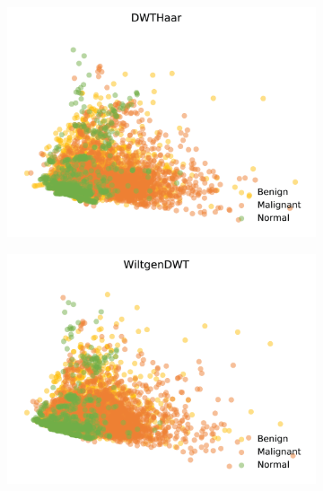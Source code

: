 \begin{figure}[H]
    \begin{subfigure}{.3\textwidth}
      \includegraphics[width=\textwidth]{contents/chapter_4/resources/visualisation_frequency_dwthaar.png}
    \end{subfigure}
    \begin{subfigure}{.3\textwidth}
      \includegraphics[width=\textwidth]{contents/chapter_4/resources/visualisation_frequency_wiltgendwt.png}
    \end{subfigure}
    \begin{subfigure}{.3\textwidth}

\end{subfigure}
\end{figure}
